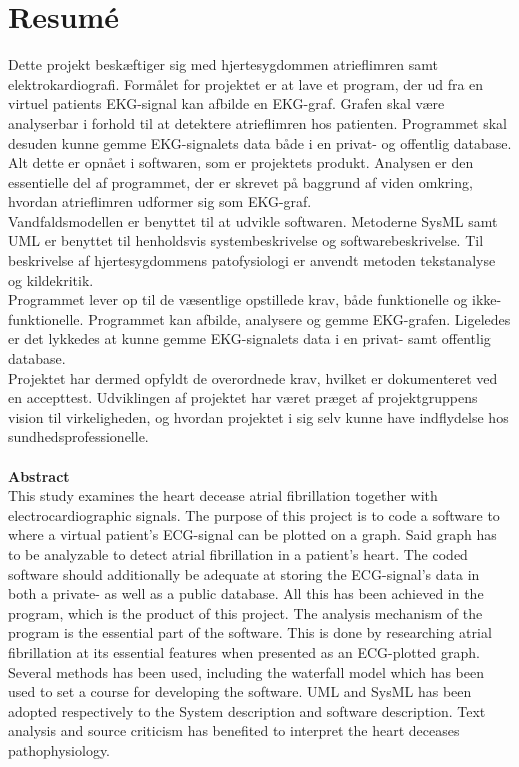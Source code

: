 \chapter{Resumé}

Dette projekt beskæftiger sig med hjertesygdommen atrieflimren samt elektrokardiografi. Formålet for projektet er at lave et program, der ud fra en virtuel patients EKG-signal kan afbilde en EKG-graf. Grafen skal være analyserbar i forhold til at detektere atrieflimren hos patienten. Programmet skal desuden kunne gemme EKG-signalets data både i en privat- og offentlig database. Alt dette er opnået i softwaren, som er projektets produkt. Analysen er den essentielle del af programmet, der er skrevet på baggrund af viden omkring, hvordan atrieflimren udformer sig som EKG-graf.\\
Vandfaldsmodellen er benyttet til at udvikle softwaren. Metoderne SysML samt UML er benyttet til henholdsvis systembeskrivelse og softwarebeskrivelse. Til beskrivelse af hjertesygdommens patofysiologi er anvendt metoden tekstanalyse og kildekritik.\\
Programmet lever op til de væsentlige opstillede krav, både funktionelle og ikke-funktionelle. Programmet kan afbilde, analysere og gemme EKG-grafen. Ligeledes er det lykkedes at kunne gemme EKG-signalets data i en privat- samt offentlig database.\\  
Projektet har dermed opfyldt de overordnede krav, hvilket er dokumenteret ved en accepttest. Udviklingen af projektet har været præget af projektgruppens vision til virkeligheden, og hvordan projektet i sig selv kunne have indflydelse hos sundhedsprofessionelle.\\
\\ \textbf{Abstract}\\
This study examines the heart decease atrial fibrillation together with electrocardiographic signals. The purpose of this project is to code a software to where a virtual patient’s ECG-signal can be plotted on a graph. Said graph has to be analyzable to detect atrial fibrillation in a patient’s heart. The coded software should additionally be adequate at storing the ECG-signal's data in both a private- as well as a public database. All this has been achieved in the program, which is the product of this project. The analysis mechanism of the program is the essential part of the software. This is done by researching atrial fibrillation at its essential features when presented as an ECG-plotted graph.\\
Several methods has been used, including the waterfall model which has been used to set a course for developing the software. UML and SysML has been adopted respectively to the System description and software description. Text analysis and source criticism has benefited to interpret the heart deceases pathophysiology.\\ 
